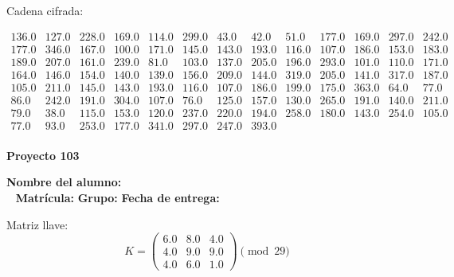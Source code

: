 \documentclass[12pt]{article}
\begin{document}
Cadena cifrada:
\begin{center}
$\begin{array}{lllllllllllll}
136.0 & 127.0 & 228.0 & 169.0 & 114.0 & 299.0 & 43.0 & 42.0 & 51.0 & 177.0 & 169.0 & 297.0 & 242.0\\
177.0 & 346.0 & 167.0 & 100.0 & 171.0 & 145.0 & 143.0 & 193.0 & 116.0 & 107.0 & 186.0 & 153.0 & 183.0\\
189.0 & 207.0 & 161.0 & 239.0 & 81.0 & 103.0 & 137.0 & 205.0 & 196.0 & 293.0 & 101.0 & 110.0 & 171.0\\
164.0 & 146.0 & 154.0 & 140.0 & 139.0 & 156.0 & 209.0 & 144.0 & 319.0 & 205.0 & 141.0 & 317.0 & 187.0\\
105.0 & 211.0 & 145.0 & 143.0 & 193.0 & 116.0 & 107.0 & 186.0 & 199.0 & 175.0 & 363.0 & 64.0 & 77.0\\
86.0 & 242.0 & 191.0 & 304.0 & 107.0 & 76.0 & 125.0 & 157.0 & 130.0 & 265.0 & 191.0 & 140.0 & 211.0\\
79.0 & 38.0 & 115.0 & 153.0 & 120.0 & 237.0 & 220.0 & 194.0 & 258.0 & 180.0 & 143.0 & 254.0 & 105.0\\
77.0 & 93.0 & 253.0 & 177.0 & 341.0 & 297.0 & 247.0 & 393.0\\
\end{array}$
\end{center}

\newpage


\textbf{Proyecto 103}

\textbf{Nombre del alumno:} \underline{\hspace{13cm}}\\\
\vspace{1cm}
\textbf{Matrícula:} \underline{\hspace{4cm}} \hspace{1cm}
\textbf{Grupo:} \underline{\hspace{2cm}}
\textbf{Fecha de entrega:} \underline{\hspace{2cm}}

\medskip

Matriz llave:
\[
K = \begin{pmatrix}
6.0 & 8.0 & 4.0\\
4.0 & 9.0 & 9.0\\
4.0 & 6.0 & 1.0
\end{pmatrix} \pmod{29}
\]
\end{document}

